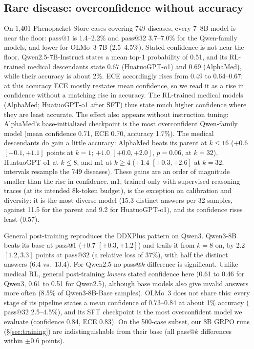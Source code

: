 \documentclass[wcp]{jmlr}
\makeatletter
\newcommand{\passk}[1]{\mathrm{pass@}#1}
\makeatother
\begin{document}
\subsection{Rare disease: overconfidence without accuracy}\label{sec:rare}
On 1,401 Phenopacket Store cases covering 749 diseases, every 7--8B model is near the floor: $\passk{1}$ is 1.4--2.2\% and $\passk{32}$ 3.7--7.0\% for the Qwen-family models, and lower for OLMo~3 7B (2.5--4.5\%).
Stated confidence is not near the floor. Qwen2.5-7B-Instruct states a mean top-1 probability of 0.51, and its RL-trained medical descendants state 0.67 (HuatuoGPT-o1) and 0.69 (AlphaMed), while their accuracy is about 2\%. ECE accordingly rises from 0.49 to 0.64--0.67; at this accuracy ECE mostly restates mean confidence, so we read it as a rise in confidence without a matching rise in accuracy.
The RL-trained medical models (AlphaMed; HuatuoGPT-o1 after SFT) thus state much higher confidence where they are least accurate. The effect also appears without instruction tuning: AlphaMed's base-initialized checkpoint is the most overconfident Qwen-family model (mean confidence 0.71, ECE 0.70, accuracy 1.7\%).
The medical descendants do gain a little accuracy: AlphaMed beats its parent at $k \le 16$ ($+0.6$ $[+0.1,+1.1]$ points at $k{=}1$; $+1.0$ $[+0.0,+2.0]$, $p{=}0.06$, at $k{=}32$), HuatuoGPT-o1 at $k \le 8$, and m1 at $k \ge 4$ ($+1.4$ $[+0.3,+2.6]$ at $k{=}32$; intervals resample the 749 diseases). These gains are an order of magnitude smaller than the rise in confidence.
m1, trained only with supervised reasoning traces (at its intended 8k-token budget), is the exception on calibration and diversity: it is the most diverse model (15.3 distinct answers per 32 samples, against 11.5 for the parent and 9.2 for HuatuoGPT-o1), and its confidence rises least (0.57).

General post-training reproduces the DDXPlus pattern on Qwen3. Qwen3-8B beats its base at $\passk{1}$ ($+0.7$ $[+0.3,+1.2]$) and trails it from $k{=}8$ on, by 2.2 $[1.2,3.3]$ points at $\passk{32}$ (a relative loss of 37\%), with half the distinct answers (6.4 vs.\ 13.4). For Qwen2.5 no pass@$k$ difference is significant.
Unlike medical RL, general post-training \emph{lowers} stated confidence here (0.61 to 0.46 for Qwen3, 0.61 to 0.51 for Qwen2.5), although base models also give invalid answers more often (8.5\% of Qwen3-8B-Base samples).
OLMo~3 does not share this: every stage of its pipeline states a mean confidence of 0.73--0.84 at about 1\% accuracy ($\passk{32}$ 2.5--4.5\%), and its SFT checkpoint is the most overconfident model we evaluate (confidence 0.84, ECE 0.83).
On the 500-case subset, our 8B GRPO runs (\S\ref{sec:training}) are indistinguishable from their base (all pass@$k$ differences within $\pm0.6$ points).
\end{document}
